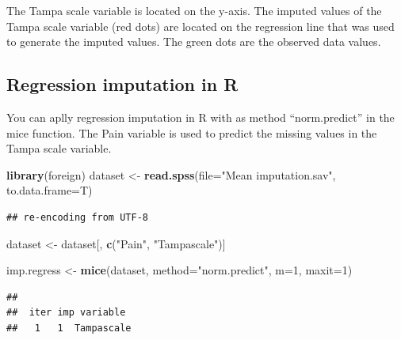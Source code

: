 \documentclass[]{book}
\newenvironment{Shaded}{\begin{snugshade}}{\end{snugshade}}
\newcommand{\KeywordTok}[1]{\textcolor[rgb]{0.13,0.29,0.53}{\textbf{#1}}}
\newcommand{\DataTypeTok}[1]{\textcolor[rgb]{0.13,0.29,0.53}{#1}}
\newcommand{\DecValTok}[1]{\textcolor[rgb]{0.00,0.00,0.81}{#1}}
\newcommand{\StringTok}[1]{\textcolor[rgb]{0.31,0.60,0.02}{#1}}
\newcommand{\CommentTok}[1]{\textcolor[rgb]{0.56,0.35,0.01}{\textit{#1}}}
\newcommand{\OperatorTok}[1]{\textcolor[rgb]{0.81,0.36,0.00}{\textbf{#1}}}
\newcommand{\NormalTok}[1]{#1}
\begin{document}
The Tampa scale variable is located on the y-axis. The imputed values of
the Tampa scale variable (red dots) are located on the regression line
that was used to generate the imputed values. The green dots are the
observed data values.

\subsection{Regression imputation in
R}\label{regression-imputation-in-r}

You can aplly regression imputation in R with as method ``norm.predict''
in the mice function. The Pain variable is used to predict the missing
values in the Tampa scale variable.

\begin{Shaded}
\begin{Highlighting}[]
\KeywordTok{library}\NormalTok{(foreign)}
\NormalTok{dataset <-}\StringTok{ }\KeywordTok{read.spss}\NormalTok{(}\DataTypeTok{file=}\StringTok{"Mean imputation.sav"}\NormalTok{, }\DataTypeTok{to.data.frame=}\NormalTok{T)}
\end{Highlighting}
\end{Shaded}

\begin{verbatim}
## re-encoding from UTF-8
\end{verbatim}

\begin{Shaded}
\begin{Highlighting}[]
\NormalTok{dataset <-}\StringTok{ }\NormalTok{dataset[, }\KeywordTok{c}\NormalTok{(}\StringTok{"Pain"}\NormalTok{, }\StringTok{"Tampascale"}\NormalTok{)]}

\NormalTok{imp.regress <-}\StringTok{ }\KeywordTok{mice}\NormalTok{(dataset, }\DataTypeTok{method=}\StringTok{"norm.predict"}\NormalTok{, }\DataTypeTok{m=}\DecValTok{1}\NormalTok{, }\DataTypeTok{maxit=}\DecValTok{1}\NormalTok{)}
\end{Highlighting}
\end{Shaded}

\begin{verbatim}
## 
##  iter imp variable
##   1   1  Tampascale
\end{verbatim}

\begin{Shaded}
\end{Shaded}
\end{document}
